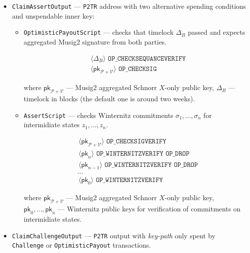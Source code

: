 \documentclass{iacrtrans}
\newcommand{\elem}[1]{\, \langle #1 \rangle \,}
\newcommand{\opcode}[1]{\, \texttt{#1} \,}
\begin{document}
\begin{itemize}
\item \texttt{ClaimAssertOutput} --- \texttt{P2TR} address with two
  alternative spending conditions and unspendable inner key:
  \begin{itemize} 
  \item \texttt{OptimisticPayoutScript} --- checks that timelock
    $\Delta_B$ passed and expects aggregated Musig2 signature from both
    parties.
    \begin{empheqboxed}
      \begin{align*}
        &\elem{\Delta_B} \opcode{OP\_CHECKSEQUANCEVERIFY} \\
        &\elem{\mathsf{pk}_{\mathcal{P} + \mathcal{V}}} \opcode{OP\_CHECKSIG}
      \end{align*}
    \end{empheqboxed}

    where $\mathsf{pk}_{\mathcal{P} + \mathcal{V}}$ --- Musig2 aggregated Schnorr
    $X$-only public key, $\Delta_B$ --- timelock in blocks (the default one
    is around two weeks).
  \item \texttt{AssertScript} --- checks Winternitz commitments
    $\sigma_1, \ldots, \sigma_n$ for intermidiate states $z_1, \ldots, z_n$.

    \begin{empheqboxed}
      \begin{align*}
        & \elem{\mathsf{pk}_{\mathcal{P} + \mathcal{V}}} \opcode{OP\_CHECKSIGVERIFY} \\
        & \elem{\mathsf{pk}_n} \opcode{OP\_WINTERNITZVERIFY} \opcode{OP\_DROP} \\
        & \elem{\mathsf{pk}_{n-1}} \opcode{OP\_WINTERNITZVERIFY} \opcode{OP\_DROP} \\
        & \ldots \\
        & \elem{\mathsf{pk}_0} \opcode{OP\_WINTERNITZVERIFY}
      \end{align*}
    \end{empheqboxed}
    where $\mathsf{pk}_{\mathcal{P} + \mathcal{V}}$ --- Musig2 aggregated Schnorr
    $X$-only public key, $\mathsf{pk}_0, \ldots, \mathsf{pk}_n$ ---
    Winternitz public keys for verification of commitments on
    intermidiate states.
  \end{itemize}
\item \texttt{ClaimChallengeOutput} --- \texttt{P2TR} output with
  \textit{key-path} only spent by \texttt{Challenge} or
  \texttt{OptimisticPayout} transactions.
\end{itemize}
\end{document}
